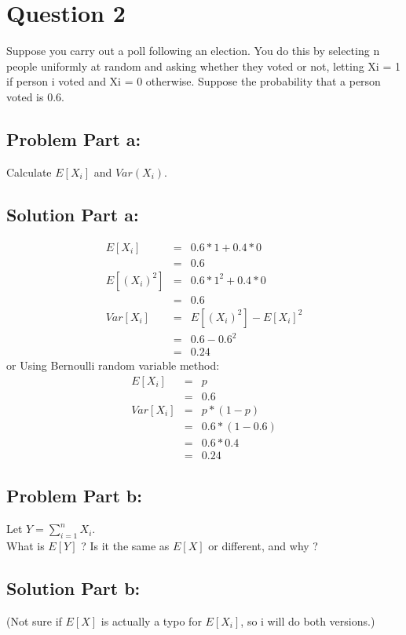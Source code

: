 \documentclass[12pt]{article}%
\begin{document}
\newpage
\section*{Question 2}
Suppose you carry out a poll following an election. You do this by selecting n people uniformly at random and asking whether they voted or not, letting Xi = 1 if person i voted and Xi = 0 otherwise. Suppose the probability that a person voted is 0.6.
\subsection*{Problem Part a:}
Calculate $E[X_i]$ and $Var(X_i)$. \\ 
\subsection*{Solution Part a:}
\begin{eqnarray*}
	E[X_i] & = & 0.6 * 1 + 0.4 * 0 \\
		   & = & 0.6 \\
	E[(X_i)^2] & = & 0.6 * 1^2 + 0.4 * 0 \\
			   & = & 0.6 \\
    Var[X_i] & = & E[(X_i)^2] - E[X_i]^2 \\
    		 & = & 0.6 - 0.6^2 \\
    		 & = & 0.24
\end{eqnarray*}
or Using Bernoulli random variable method:
\begin{eqnarray*}
	E[X_i] & = & p \\
		   & = & 0.6 \\
    Var[X_i] & = & p * (1-p) \\
    		 & = & 0.6 * (1-0.6) \\
    		 & = & 0.6 * 0.4 \\
    		 & = & 0.24
\end{eqnarray*}
\subsection*{Problem Part b:}
Let $Y = \sum_{i=1}^{n} X_i$. \\
What is $E[Y]$ ? Is it the same as $E[X]$ or different, and why ?
\subsection*{Solution Part b:}
(Not sure if $E[X]$ is actually a typo for $E[X_i]$, so i will do both versions.) \\
\end{document}
